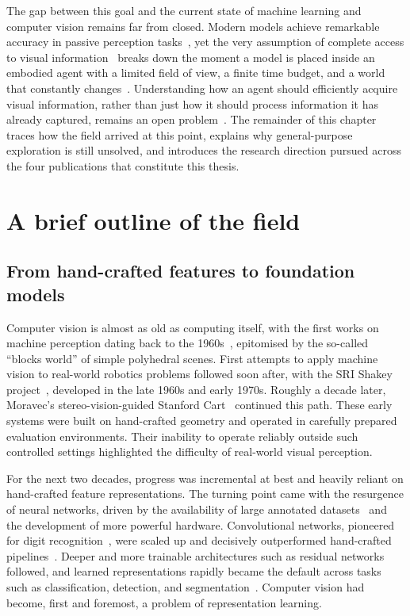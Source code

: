 The gap between this goal and the current state of machine learning and computer vision remains far from closed. Modern models achieve remarkable
accuracy in passive perception tasks~\cite{krizhevsky2012imagenet,dosovitskiy2021image,achiam2023gpt},
yet the very assumption of complete access to visual information~\cite{girdhar2022omnivore} breaks down the moment
a model is placed inside an embodied agent with a limited field of view, a
finite time budget, and a world that constantly changes~\cite{ramakrishnan2021exploration,wenzel2021four}. Understanding how an agent
should efficiently acquire visual information, rather than just how it should process information it has already
captured, remains an open problem~\cite{ramakrishnan2021exploration,bajcsy2018revisiting,duan2022survey,liu2025embodied}. The remainder of this chapter traces how the field arrived at this point, explains why general-purpose exploration is
still unsolved, and introduces the research direction pursued across the four publications that constitute this thesis.

\section{A brief outline of the field}
\label{sec:a-brief-outline-of-the-field}

\subsection{From hand-crafted features to foundation models}

Computer vision is almost as old as computing itself, with the first works on machine perception dating back to the 1960s~\cite{roberts1963machine},
epitomised by the so-called ``blocks world'' of simple polyhedral scenes. First attempts to apply machine vision to real-world robotics problems followed
soon after, with the SRI Shakey project~\cite{nilsson1984shakey}, developed in the late 1960s and early 1970s. Roughly a decade later, Moravec's stereo-vision-guided Stanford Cart~\cite{moravec1980obstacle} continued this path. These early systems were built on hand-crafted geometry and operated in carefully prepared evaluation environments.
Their inability to operate reliably outside such controlled settings highlighted
the difficulty of real-world visual perception.

For the next two decades, progress was incremental at best and heavily reliant on hand-crafted feature representations.
The turning point came with the resurgence of neural networks, driven by the
availability of large annotated datasets~\cite{deng2009imagenet} and the development of more powerful hardware. Convolutional networks, pioneered for
digit recognition~\cite{lecun1998gradient}, were scaled up and decisively outperformed hand-crafted pipelines~\cite{krizhevsky2012imagenet}. Deeper and more trainable
architectures such as residual networks~\cite{he2016deep} followed, and learned representations rapidly became the default across tasks such as classification, detection, and
segmentation~\cite{lecun2015deep}. Computer vision had become, first and foremost, a problem of representation learning.

